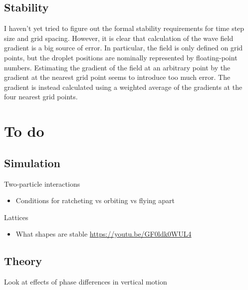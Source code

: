 \documentclass{article}
\begin{document}
\subsection{Stability}
I haven't yet tried to figure out the formal stability requirements for time step size and grid spacing.
However, it is clear that calculation of the wave field gradient is a big source of error. In particular, the field is only defined on grid points, but the droplet positions are nominally represented by floating-point numbers. Estimating the gradient of the field at an arbitrary point by the gradient at the nearest grid point seems to introduce too much error. The gradient is instead calculated using a weighted average of the gradients at the four nearest grid points.\\


\section{To do}
\subsection{Simulation}
Two-particle interactions
\begin{itemize}
	\item Conditions for ratcheting vs orbiting vs flying apart
\end{itemize}
Lattices
\begin{itemize}
	\item What shapes are stable \url{https://youtu.be/GF0ldk0WUL4}
\end{itemize}
\subsection{Theory}
Look at effects of phase differences in vertical motion
	
\end{document}
